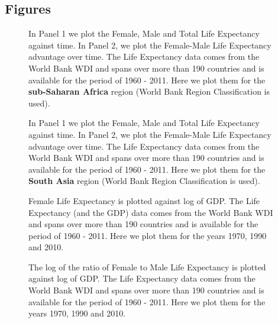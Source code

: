 \documentclass[11pt]{article}
\begin{document}
\begin{spacing}{1.4}
\section*{Figures}
\begin{figure}[htpb!]
\centering
{}
\caption{\footnotesize In Panel 1 we plot the Female, Male and Total Life Expectancy against time. In Panel 2, we plot the Female-Male Life Expectancy advantage over time. The Life Expectancy data comes from the World Bank WDI and spans over more than 190 countries and is available for the period of 1960 - 2011. Here we plot them for the \textbf{sub-Saharan Africa} region (World Bank Region Classification is used). \label{SSALEtrend}}
\end{figure}



\begin{figure}[htpb!]
\centering
{}
\caption{\footnotesize In Panel 1 we plot the Female, Male and Total Life Expectancy against time. In Panel 2, we plot the Female-Male Life Expectancy advantage over time.  The Life Expectancy data comes from the World Bank WDI and spans over more than 190 countries and is available for the period of 1960 - 2011. Here we plot them for the \textbf{South Asia } region (World Bank Region Classification is used). \label{SASLEtrend}}
\end{figure}


\begin{figure}[htpb!]
\centering
{}
\caption{\footnotesize Female Life Expectancy is plotted  against log of GDP. The Life Expectancy (and the GDP) data comes from the World Bank WDI and spans over more than 190 countries and is available for the period of 1960 - 2011. Here we plot them for the years 1970, 1990 and 2010. \label{lLEGDP}}
\end{figure}

\begin{figure}[htpb!]
\centering
{}
\caption{\footnotesize The log of the ratio of Female to Male Life Expectancy is plotted  against log of GDP. The Life Expectancy data comes from the World Bank WDI and spans over more than 190 countries and is available for the period of 1960 - 2011. Here we plot them for the years 1970, 1990 and 2010. \label{lLErGDP0}}
\end{figure}


\end{spacing}
\end{document}
